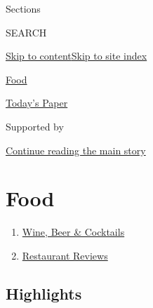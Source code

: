 Sections

SEARCH

\protect\hyperlink{site-content}{Skip to
content}\protect\hyperlink{site-index}{Skip to site index}

\href{https://www.nytimes.com/section/food}{Food}

\href{https://myaccount.nytimes.com/auth/login?response_type=cookie\&client_id=vi}{}

\href{https://www.nytimes.com/section/todayspaper}{Today's Paper}

Supported by

\protect\hyperlink{after-sponsor}{Continue reading the main story}

\hypertarget{food}{%
\section{Food}\label{food}}

\begin{enumerate}
\def\labelenumi{\arabic{enumi}.}
\tightlist
\item
  \href{/section/food/drinks}{Wine, Beer \& Cocktails}
\item
  \href{/reviews/dining}{Restaurant Reviews}
\end{enumerate}

\hypertarget{highlights}{%
\subsection{Highlights}\label{highlights}}

